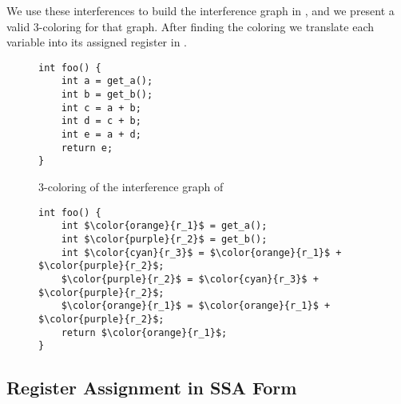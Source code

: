 We use these interferences to build the interference graph in , and we present a valid 3-coloring for that graph. After finding the coloring we translate each variable into its assigned register in .

\begin{figure}[ht]
\centering
\begin{minipage}{0.48\textwidth}
\lstset{style=C}
\begin{lstlisting}[caption={C program returning $2a + 3b$}, label={fig:ig1}]
int foo() {
    int a = get_a();
    int b = get_b();
    int c = a + b;
    int d = c + b;
    int e = a + d;
    return e;
}
\end{lstlisting}
\end{minipage}
\hfill
\begin{minipage}{0.48\textwidth}
  \centering
  \caption{3-coloring of the interference graph of }
  \label{fig:ig2}
\end{minipage}
\end{figure}

\begin{figure}
\label{fig:ig3}
\lstset{style=C}
\begin{lstlisting}[caption={Program shown in \Cref{fig:ig1} after \gls{ra}}, label={fig:ig1}]
int foo() {
    int $\color{orange}{r_1}$ = get_a();
    int $\color{purple}{r_2}$ = get_b();
    int $\color{cyan}{r_3}$ = $\color{orange}{r_1}$ + $\color{purple}{r_2}$;
    $\color{purple}{r_2}$ = $\color{cyan}{r_3}$ + $\color{purple}{r_2}$;
    $\color{orange}{r_1}$ = $\color{orange}{r_1}$ + $\color{purple}{r_2}$;
    return $\color{orange}{r_1}$;
}
\end{lstlisting}
\end{figure}

\subsection{Register Assignment in SSA Form}
\label{subsec:ssara}

